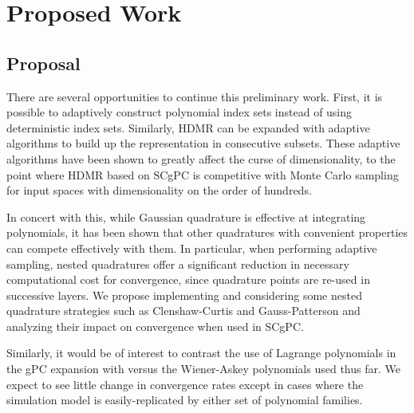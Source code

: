 
\chapter{Proposed Work} %

\label{ch:proposed} %



\section{Proposal}
There are several opportunities to continue this preliminary work.  First, it is possible \cite{Gerstner} to
adaptively construct polynomial index sets instead of using deterministic index sets.  Similarly, HDMR can be
expanded with adaptive algorithms to build up the representation in consecutive subsets\cite{Ayres}.  These adaptive
algorithms have been shown to greatly affect the curse of dimensionality, to the point where HDMR based on
SCgPC is competitive with Monte Carlo sampling for input spaces with dimensionality on the order of hundreds.

In concert with this, while Gaussian quadrature is effective at integrating polynomials, it has been shown
\cite{goodclenshaw} that other quadratures with convenient properties can compete effectively with them.  In
particular, when performing adaptive sampling, nested quadratures offer a significant reduction in necessary
computational cost for convergence, since quadrature points are re-used in successive layers.  We propose
implementing and considering some nested quadrature strategies such as Clenshaw-Curtis and Gauss-Patterson and
analyzing their impact on convergence when used in SCgPC.

Similarly, it would be of interest to contrast the use of Lagrange polynomials in the gPC expansion with
versus the Wiener-Askey polynomials used thus far.  We expect to see little change in convergence rates except
in cases where the simulation model is easily-replicated by either set of polynomial families.

